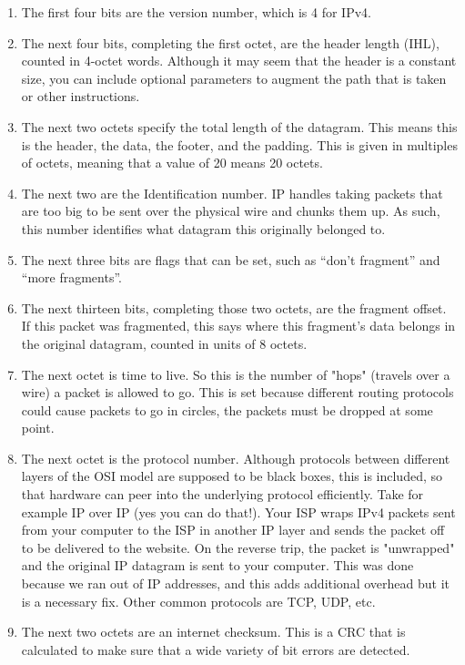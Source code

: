 \begin{enumerate}
  \item The first four bits are the version number, which is 4 for IPv4.
  \item The next four bits, completing the first octet, are the header length (IHL), counted in 4-octet words.
    Although it may seem that the header is a constant size, you can include optional parameters to augment the path that is taken or other instructions.
  \item The next two octets specify the total length of the datagram.
    This means this is the header, the data, the footer, and the padding.
    This is given in multiples of octets, meaning that a value of 20 means 20 octets.
  \item The next two are the Identification number.
    IP handles taking packets that are too big to be sent over the physical wire and chunks them up.
    As such, this number identifies what datagram this originally belonged to.
  \item The next three bits are flags that can be set, such as ``don't fragment'' and ``more fragments''.
  \item The next thirteen bits, completing those two octets, are the fragment offset.
    If this packet was fragmented, this says where this fragment's data belongs in the original datagram, counted in units of 8 octets.
  \item The next octet is time to live.
    So this is the number of "hops" (travels over a wire) a packet is allowed to go.
    This is set because different routing protocols could cause packets to go in circles, the packets must be dropped at some point.
  \item The next octet is the protocol number.
    Although protocols between different layers of the OSI model are supposed to be black boxes, this is included, so that hardware can peer into the underlying protocol efficiently.
    Take for example IP over IP (yes you can do that!).
    Your ISP wraps IPv4 packets sent from your computer to the ISP in another IP layer and sends the packet off to be delivered to the website.
    On the reverse trip, the packet is "unwrapped" and the original IP datagram is sent to your computer.
    This was done because we ran out of IP addresses, and this adds additional overhead but it is a necessary fix.
    Other common protocols are TCP, UDP, etc.
  \item The next two octets are an internet checksum.
    This is a CRC that is calculated to make sure that a wide variety of bit errors are detected.

\end{enumerate}
